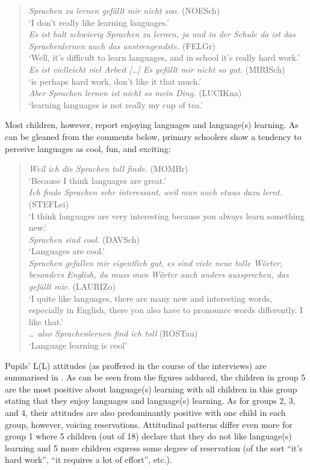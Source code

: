 \documentclass[output=paper]{../langscibook}
\begin{document}
\begin{quote}\sloppy
\textit{Sprachen zu lernen gefällt mir nicht soo.} (NOESch)\\
`I don’t really like learning languages.'\medskip\\
\textit{Es ist halt schwierig Sprachen zu lernen, ja und in der Schule da ist das Sprachenlernen auch das anstrengendste.} (FELGr)\\
`Well, it’s difficult to learn languages, and in school it’s really hard work.'\medskip\\
\textit{Es ist vielleicht viel Arbeit […] Es gefällt mir nicht so gut.} (MIRISch)\\
`is perhaps hard work, don’t like it that much.'\medskip\\
\textit{Aber Sprachen lernen ist nicht so mein Ding.} (LUCIKna)\\
`learning languages is not really my cup of tea.'
\end{quote}

Most children, however, report enjoying languages and language(s) learning. As can be gleaned from the comments below, primary schoolers show a tendency to perceive languages as cool, fun, and exciting:

\begin{quote}
\textit{Weil ich die Sprachen toll finde.} (MOMBr)\\
`Because I think languages are great.'\medskip\\
\textit{Ich finde Sprachen sehr interessant, weil man auch etwas dazu lernt.} (STEFLei)\\
`I think languages are very interesting because you always learn something new.'\medskip\\
\textit{Sprachen sind cool.} (DAVSch)\\
`Languages are cool.'\medskip\\
\textit{Sprachen gefallen mir eigentlich gut, es sind viele neue tolle Wörter, besonders English, da muss man Wörter auch anders aussprechen, das gefällt mir.} (\mbox{LAURIZo})\\
`I quite like languages, there are many new and interesting words, especially in English, there you also have to pronounce words differently. I like that.'\medskip\\
\textit{… also Sprachenlernen find ich toll} (ROSTau)\\
`Language learning is cool'
\end{quote}

Pupils’ L(L) attitudes (as proffered in the course of the interviews) are summarised in . As can be seen from the figures adduced, the children in group 5 are the most positive about language(s) learning with all children in this group stating that they enjoy languages and language(s) learning. As for groups 2, 3, and 4, their attitudes are also predominantly positive with one child in each group, however, voicing reservations. Attitudinal patterns differ even more for group 1 where 5 children (out of 18) declare that they do not like language(s) learning and 5 more children express some degree of reservation (of the sort ``it’s hard work'', ``it requires a lot of effort'', etc.).
\end{document}
